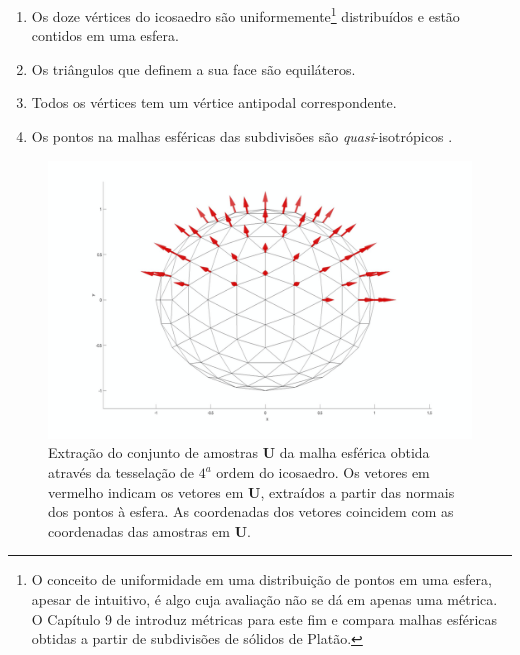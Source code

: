 \documentclass[
    12pt,                %
    oneside,            %
    a4paper,            %
    english,            %
    french,                %
    spanish,            %
    brazil                %
    ]{abntex2}
\begin{document}
\begin{enumerate}
    \item Os doze vértices do icosaedro são uniformemente\footnote{O conceito de uniformidade em uma distribuição de pontos em uma esfera, apesar de intuitivo, é algo cuja avaliação não se dá em apenas uma métrica. O Capítulo 9 de \cite{popko2012} introduz métricas para este fim e compara malhas esféricas obtidas a partir de subdivisões de sólidos de Platão.} distribuídos e estão contidos em uma esfera.
    \item Os triângulos que definem a sua face são equiláteros.
    \item Todos os vértices tem um vértice antipodal correspondente.
    \item Os pontos na malhas esféricas das subdivisões são \textit{quasi}-isotrópicos \cite{popko2012}.
\end{enumerate}



 \begin{figure}[ht]
     \centering
     \includegraphics[width=.8\linewidth, angle=0]{figs/HARDI/icosphere_normals.png}
     \caption{
     Extração do conjunto de amostras $\mathbf{U}$ da malha esférica obtida através da tesselação de $4^a$ ordem do icosaedro. Os vetores em vermelho indicam os vetores em $\mathbf{U}$, extraídos a partir das normais dos pontos à esfera. As coordenadas dos vetores coincidem com as coordenadas das amostras em $\mathbf{U}$.%
     }
     \label{fig::direcoes}
   \hspace{1pt}
 \end{figure}
\end{document}
